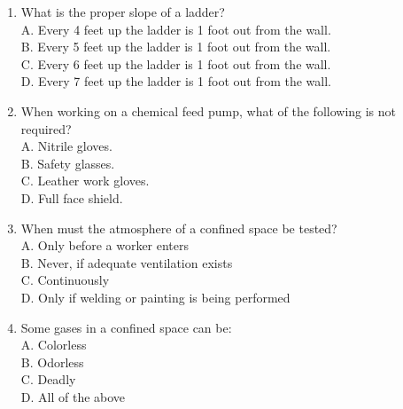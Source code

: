 \begin{enumerate}[1.]
\item What is the proper slope of a ladder?\\
A.	Every 4 feet up the ladder is 1 foot out from the wall.\\
B.	Every 5 feet up the ladder is 1 foot out from the wall. \\
C.	Every 6 feet up the ladder is 1 foot out from the wall.\\
D.	Every 7 feet up the ladder is 1 foot out from the wall.


\item When working on a chemical feed pump, what of the following is not required?\\
A.	Nitrile gloves.\\
B.	Safety glasses.\\
C.	Leather work gloves.\\
D.	Full face shield.

\item When must the atmosphere of a confined space be tested?\\
A.	Only before a worker enters\\
B.	Never, if adequate ventilation exists\\
C.	Continuously\\
D.	Only if welding or painting is being performed

\item Some gases in a confined space can be:\\
A.	Colorless\\
B.	Odorless\\
C.	Deadly\\
D.	All of the above


\end{enumerate}
